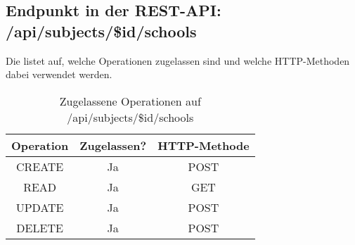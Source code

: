 \subsection{Endpunkt in der REST-API: /api/subjects/\$id/schools}
Die  listet auf, welche Operationen zugelassen sind und welche HTTP-Methoden dabei verwendet werden. 

\begin{table}[!htbp]
	\begin{tabular}{|c|c|c|}
		\hline
			\textbf{Operation} & \textbf{Zugelassen?} & \textbf{HTTP-Methode} \\ \hline
			CREATE & Ja & POST \\ \hline 
			READ & Ja & GET \\ \hline
			UPDATE & Ja & POST \\ \hline 
			DELETE & Ja & POST \\ \hline
	\end{tabular}

		\caption{Zugelassene Operationen auf /api/subjects/\$id/schools}
		\label{tab:rest:api:subjects:id:schools:meth}
\end{table}


